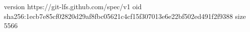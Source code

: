 version https://git-lfs.github.com/spec/v1
oid sha256:1ecb7e85cf02820d29af8fbc05621c4cf15f307013e6e22bf502ed491f2f9388
size 5566
